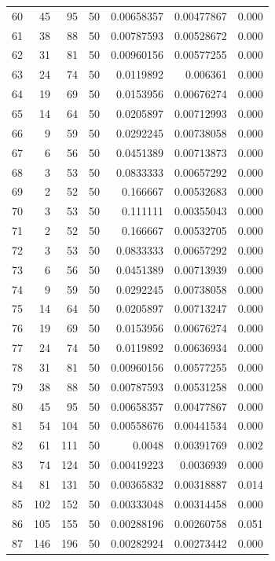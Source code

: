 \begin{tabular}{r r r r r r r}
60 & 45 & 95 & 50 & 0.00658357 & 0.00477867 & 0.000 \\
61 & 38 & 88 & 50 & 0.00787593 & 0.00528672 & 0.000 \\
62 & 31 & 81 & 50 & 0.00960156 & 0.00577255 & 0.000 \\
63 & 24 & 74 & 50 & 0.0119892 & 0.006361 & 0.000 \\
64 & 19 & 69 & 50 & 0.0153956 & 0.00676274 & 0.000 \\
65 & 14 & 64 & 50 & 0.0205897 & 0.00712993 & 0.000 \\
66 & 9 & 59 & 50 & 0.0292245 & 0.00738058 & 0.000 \\
67 & 6 & 56 & 50 & 0.0451389 & 0.00713873 & 0.000 \\
68 & 3 & 53 & 50 & 0.0833333 & 0.00657292 & 0.000 \\
69 & 2 & 52 & 50 & 0.166667 & 0.00532683 & 0.000 \\
70 & 3 & 53 & 50 & 0.111111 & 0.00355043 & 0.000 \\
71 & 2 & 52 & 50 & 0.166667 & 0.00532705 & 0.000 \\
72 & 3 & 53 & 50 & 0.0833333 & 0.00657292 & 0.000 \\
73 & 6 & 56 & 50 & 0.0451389 & 0.00713939 & 0.000 \\
74 & 9 & 59 & 50 & 0.0292245 & 0.00738058 & 0.000 \\
75 & 14 & 64 & 50 & 0.0205897 & 0.00713247 & 0.000 \\
76 & 19 & 69 & 50 & 0.0153956 & 0.00676274 & 0.000 \\
77 & 24 & 74 & 50 & 0.0119892 & 0.00636934 & 0.000 \\
78 & 31 & 81 & 50 & 0.00960156 & 0.00577255 & 0.000 \\
79 & 38 & 88 & 50 & 0.00787593 & 0.00531258 & 0.000 \\
80 & 45 & 95 & 50 & 0.00658357 & 0.00477867 & 0.000 \\
81 & 54 & 104 & 50 & 0.00558676 & 0.00441534 & 0.000 \\
82 & 61 & 111 & 50 & 0.0048 & 0.00391769 & 0.002 \\
83 & 74 & 124 & 50 & 0.00419223 & 0.0036939 & 0.000 \\
84 & 81 & 131 & 50 & 0.00365832 & 0.00318887 & 0.014 \\
85 & 102 & 152 & 50 & 0.00333048 & 0.00314458 & 0.000 \\
86 & 105 & 155 & 50 & 0.00288196 & 0.00260758 & 0.051 \\
87 & 146 & 196 & 50 & 0.00282924 & 0.00273442 & 0.000 \\

\end{tabular}
